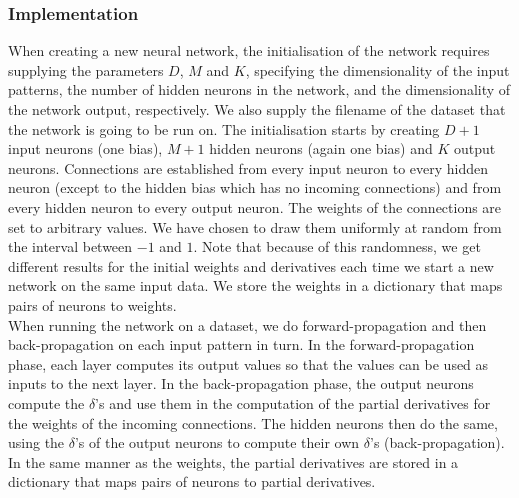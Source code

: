 \documentclass[a4paper]{article}
\begin{document}
\subsubsection{Implementation}
When creating a new neural network, the initialisation of the network requires supplying the parameters $D$, $M$ and $K$, specifying the dimensionality of the input patterns, the number of hidden neurons in the network, and the dimensionality of the network output, respectively. We also supply the filename of the dataset that the network is going to be run on. The initialisation starts by creating $D+1$ input neurons (one bias), $M+1$ hidden neurons (again one bias) and $K$ output neurons. Connections are established from every input neuron to every hidden neuron (except to the hidden bias which has no incoming connections) and from every hidden neuron to every output neuron. The weights of the connections are set to arbitrary values. We have chosen to draw them uniformly at random from the interval between $-1$ and $1$. Note that because of this randomness, we get different results for the initial weights and derivatives each time we start a new network on the same input data. We store the weights in a dictionary that maps pairs of neurons to weights.\\

When running the network on a dataset, we do forward-propagation and then back-propagation on each input pattern in turn. In the forward-propagation phase, each layer computes its output values so that the values can be used as inputs to the next layer. In the back-propagation phase, the output neurons compute the $\delta$'s and use them in the computation of the partial derivatives for the weights of the incoming connections. The hidden neurons then do the same, using the $\delta$'s of the output neurons to compute their own $\delta$'s (back-propagation). In the same manner as the weights, the partial derivatives are stored in a dictionary that maps pairs of neurons to partial derivatives.\\
\end{document}
